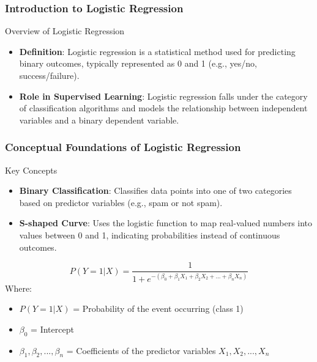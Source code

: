 \documentclass[aspectratio=169]{beamer}
\begin{document}
\frame{\titlepage}

\begin{frame}[fragile]
    \frametitle{Introduction to Logistic Regression}
    \begin{block}{Overview of Logistic Regression}
        \begin{itemize}
            \item \textbf{Definition}: Logistic regression is a statistical method used for predicting binary outcomes, typically represented as 0 and 1 (e.g., yes/no, success/failure).
            \item \textbf{Role in Supervised Learning}: Logistic regression falls under the category of classification algorithms and models the relationship between independent variables and a binary dependent variable.
        \end{itemize}
    \end{block}
\end{frame}

\begin{frame}[fragile]
    \frametitle{Conceptual Foundations of Logistic Regression}
    \begin{block}{Key Concepts}
        \begin{itemize}
            \item \textbf{Binary Classification}: Classifies data points into one of two categories based on predictor variables (e.g., spam or not spam).
            \item \textbf{S-shaped Curve}: Uses the logistic function to map real-valued numbers into values between 0 and 1, indicating probabilities instead of continuous outcomes.
        \end{itemize}
    \end{block}
    \begin{equation}
        P(Y=1 | X) = \frac{1}{1 + e^{-(\beta_0 + \beta_1 X_1 + \beta_2 X_2 + ... + \beta_n X_n)}}
    \end{equation}
    Where:
    \begin{itemize}
        \item $P(Y=1 | X)$ = Probability of the event occurring (class 1)
        \item $\beta_0$ = Intercept
        \item $\beta_1, \beta_2, ..., \beta_n$ = Coefficients of the predictor variables $X_1, X_2, ..., X_n$
    \end{itemize}
\end{frame}
\end{document}

